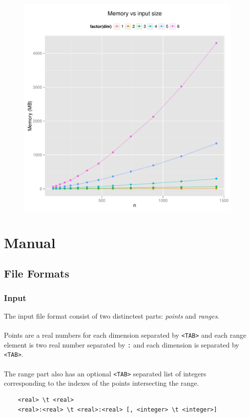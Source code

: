 \documentclass{article}
\begin{document}
\begin{figure}[H]
    \centering
    \includegraphics[width=\textwidth]{../src/R/plots/rtmem.pdf}
\end{figure}
\newpage
\section{Manual}
  \subsection{File Formats}
  \subsubsection{Input}
  The input file format consist of two distinctest parts: \textit{points} and 
  \textit{ranges}. 
  \\
  \\
  Points are a real numbers for each dimension separated by \verb|<TAB>| and 
  each range element is two real number separated by \verb|:| and each dimension
  is separated by \verb|<TAB>|.
  \\
  \\
  The range part also has an optional \verb|<TAB>| separated list of integers 
  corresponding to the indexes of the points intersecting the range.  
  \begin{verbatim}
  	<real> \t <real>
  	<real>:<real> \t <real>:<real> [, <integer> \t <integer>]
  \end{verbatim}
  
\end{document}
